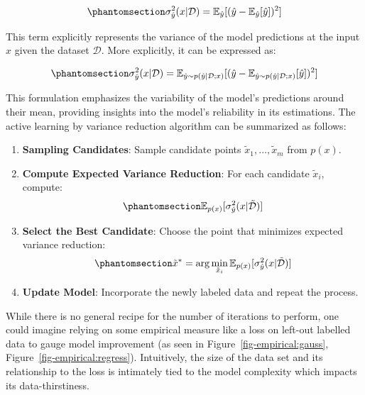 \documentclass[
  letterpaper,
  numbers=noenddot,
  DIV=11]{scrreprt}
\providecommand{\tightlist}{%
  \setlength{\itemsep}{0pt}\setlength{\parskip}{0pt}}\usepackage{longtable,booktabs,array}
\theoremstyle{definition}
\theoremstyle{plain}
\theoremstyle{plain}
\theoremstyle{remark}
\begin{document}
\begin{equation}\phantomsection\label{eq-eq3.21}{
\sigma^2_{\hat{y}} (x | \mathcal{D}) = \mathbb{E}_{\hat{y}} [(\hat{y} - \mathbb{E}_{\hat{y}}[\hat{y}])^2]
}\end{equation}

This term explicitly represents the variance of the model predictions at
the input \(x\) given the dataset \(\mathcal{D}\). More explicitly, it
can be expressed as:

\begin{equation}\phantomsection\label{eq-eq3.22}{
\sigma^2_{\hat{y}} (x | \mathcal{D}) =  \mathbb{E}_{\hat{y} \sim p(\hat{y} | \mathcal{D}; x)} [(\hat{y} - \mathbb{E}_{\hat{y} \sim p(\hat{y} | \mathcal{D}; x)}[\hat{y}])^2]
}\end{equation}

This formulation emphasizes the variability of the model's predictions
around their mean, providing insights into the model's reliability in
its estimations. The active learning by variance reduction algorithm can
be summarized as follows:

\begin{enumerate}
\def\labelenumi{\arabic{enumi}.}
\tightlist
\item
  \textbf{Sampling Candidates}: Sample candidate points
  \(\tilde{x}_1, \dots, \tilde{x}_m\) from \(p(x)\).
\item
  \textbf{Compute Expected Variance Reduction}: For each candidate
  \(\tilde{x}_i\), compute:
  \begin{equation}\phantomsection\label{eq-eq3.23}{
  \mathbb{E}_{p(x)} [\sigma^2_{\hat{y}} (x | \tilde{\mathcal{D}})]
  }\end{equation}
\item
  \textbf{Select the Best Candidate}: Choose the point that minimizes
  expected variance reduction:
  \begin{equation}\phantomsection\label{eq-eq3.24}{
     \tilde{x}^* = \arg\min_{\tilde{x}_i} \mathbb{E}_{p(x)} [\sigma^2_{\hat{y}} (x | \tilde{\mathcal{D}})]
  }\end{equation}
\item
  \textbf{Update Model}: Incorporate the newly labeled data and repeat
  the process.
\end{enumerate}

While there is no general recipe for the number of iterations to
perform, one could imagine relying on some empirical measure like a loss
on left-out labelled data to gauge model improvement (as seen in
Figure~\ref{fig-empirical:gauss}, Figure~\ref{fig-empirical:regress}).
Intuitively, the size of the data set and its relationship to the loss
is intimately tied to the model complexity which impacts its
data-thirstiness.
\end{document}
